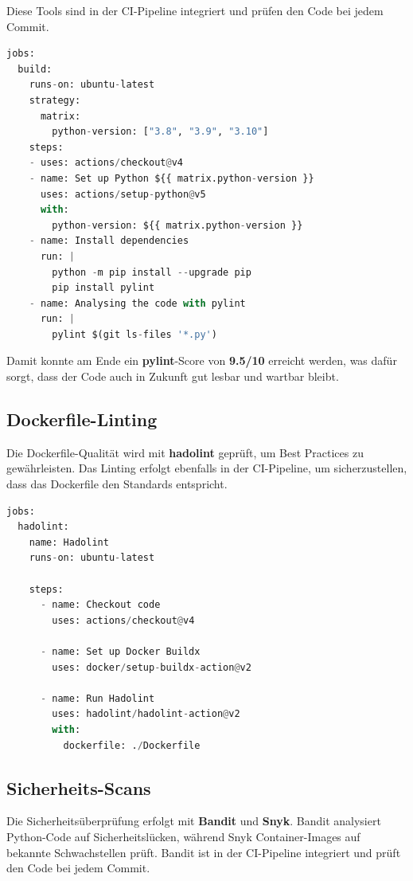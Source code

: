 \documentclass{article}
\begin{document}
Diese Tools sind in der CI-Pipeline integriert und prüfen den Code bei jedem Commit. 

\begin{lstlisting}[language=python,caption={pylint.yml}]
jobs:
  build:
    runs-on: ubuntu-latest
    strategy:
      matrix:
        python-version: ["3.8", "3.9", "3.10"]
    steps:
    - uses: actions/checkout@v4
    - name: Set up Python ${{ matrix.python-version }}
      uses: actions/setup-python@v5
      with:
        python-version: ${{ matrix.python-version }}
    - name: Install dependencies
      run: |
        python -m pip install --upgrade pip
        pip install pylint
    - name: Analysing the code with pylint
      run: |
        pylint $(git ls-files '*.py')
\end{lstlisting}

\noindent
Damit konnte am Ende ein \textbf{pylint}-Score von \textbf{9.5/10} erreicht werden, was dafür sorgt, dass der Code auch in Zukunft gut lesbar und wartbar bleibt.

\subsection{Dockerfile-Linting}
\noindent
Die Dockerfile-Qualität wird mit \textbf{hadolint} geprüft, um Best Practices zu gewährleisten.
Das Linting erfolgt ebenfalls in der CI-Pipeline, um sicherzustellen, dass das Dockerfile den Standards entspricht.

\begin{lstlisting}[language=python,caption={hadolint.yml}]
jobs:
  hadolint:
    name: Hadolint
    runs-on: ubuntu-latest

    steps:
      - name: Checkout code
        uses: actions/checkout@v4

      - name: Set up Docker Buildx
        uses: docker/setup-buildx-action@v2

      - name: Run Hadolint
        uses: hadolint/hadolint-action@v2
        with:
          dockerfile: ./Dockerfile
\end{lstlisting}

\newpage

\subsection{Sicherheits-Scans}
Die Sicherheitsüberprüfung erfolgt mit \textbf{Bandit} und \textbf{Snyk}.
Bandit analysiert Python-Code auf Sicherheitslücken, während Snyk Container-Images auf bekannte Schwachstellen prüft.
Bandit ist in der CI-Pipeline integriert und prüft den Code bei jedem Commit.
\end{document}
